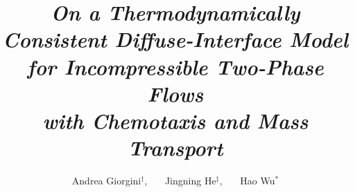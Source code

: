 \documentclass[11pt,reqno]{amsart}
\begin{document}
\title[Navier--Stokes/Cahn--Hilliard system for two-phase flows with chemotaxis]{
\emph{On a Thermodynamically Consistent Diffuse-Interface Model for Incompressible Two-Phase Flows \\ with Chemotaxis and Mass Transport
}}

\author[A. Giorgini, J.-N. He \& H. Wu]{
Andrea Giorgini$^\dagger$,\ \ \
%
Jingning He$^\ddagger$,\ \ \
%
Hao Wu$^\ast$
}

\address{$^\dagger$Dipartimento di Matematica \\
Politecnico di Milano \\
Milano 20133, Italy}

\address{$^\ddagger$School of Mathematics \\
Hangzhou Normal University \\
Hangzhou 311121, P. R. China}

\address{$^\ast$School of Mathematical Sciences\\
Fudan University\\
Shanghai 200433, P. R. China}
%
\end{document}

